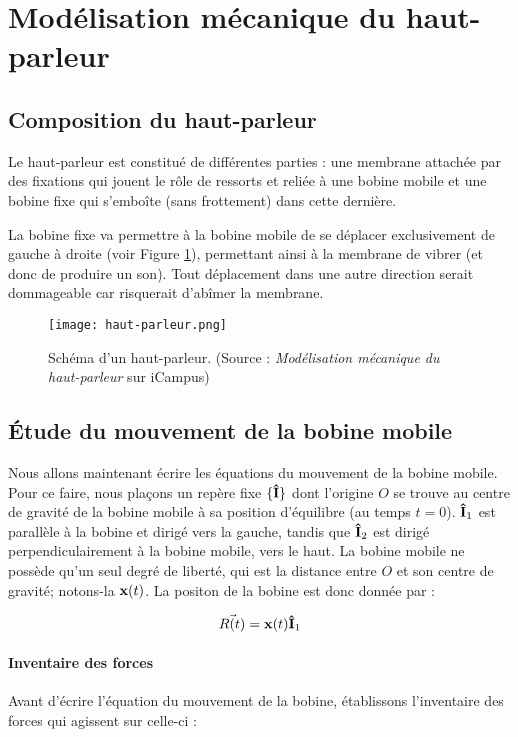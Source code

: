 

\section{Modélisation mécanique du haut-parleur}

\subsection{Composition du haut-parleur}
Le haut-parleur est constitué de différentes parties : une membrane
attachée par des fixations qui jouent le rôle de ressorts et reliée à 
une bobine mobile et une bobine fixe qui s'emboîte (sans frottement) 
dans cette dernière.

La bobine fixe va permettre à la bobine mobile de se déplacer exclusivement de gauche
à droite (voir Figure \ref{hp-scheme}), permettant ainsi à la membrane de vibrer 
(et donc de produire un son). Tout déplacement dans une autre direction serait dommageable
car risquerait d'abîmer la membrane.

\begin{figure}[ht!]
	\centering
	\texttt{[image: haut-parleur.png]}
	\caption{Schéma d'un haut-parleur. (Source : \textit{Modélisation mécanique du haut-parleur} sur iCampus)}
	\label{hp-scheme}
\end{figure}

\subsection{Étude du mouvement de la bobine mobile}
Nous allons maintenant écrire les équations du mouvement de la bobine mobile.
Pour ce faire, nous plaçons un repère fixe $\{{\bf\hat{I}}\}$ dont l'origine $O$ se trouve
au centre de gravité de la bobine mobile à sa position d'équilibre (au 
temps $t=0$). ${\bf\hat{ I}}_1$ est parallèle à la bobine et dirigé vers la gauche, tandis que
${\bf\hat{ I}}_2$ est dirigé perpendiculairement à la bobine mobile, vers le haut.
La bobine mobile ne possède qu'un seul degré de liberté, qui
est la distance entre $O$ et son centre de gravité; notons-la ${\bf x}(t)$.
La positon de la bobine est donc donnée par :

$$\vec{R(t)} = {\bf x}(t) {\bf\hat{ I}}_1$$ 

\paragraph{Inventaire des forces}
Avant d'écrire l'équation du mouvement de la bobine, établissons l'inventaire
des forces qui agissent sur celle-ci :

